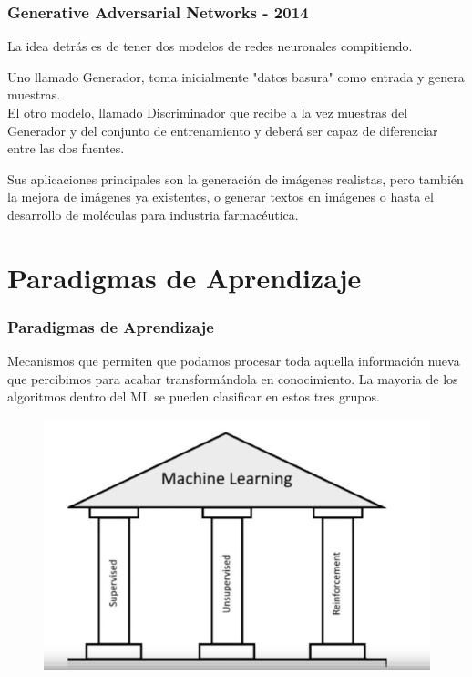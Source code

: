 \documentclass[
	11pt, %
]{beamer}
\begin{document}
\begin{frame}
  \frametitle{Generative Adversarial Networks - 2014}

  La idea detrás es de tener dos modelos de redes neuronales compitiendo.
  
  \bigskip %

  Uno llamado Generador, toma inicialmente "datos basura" como entrada y genera muestras.\\
  El otro modelo, llamado Discriminador que recibe a la vez muestras del Generador y del conjunto de entrenamiento y deberá ser capaz de diferenciar entre las dos fuentes.

  \bigskip %

  Sus aplicaciones principales son la generación de imágenes realistas, pero también la mejora de imágenes ya existentes, o generar textos en imágenes o hasta el desarrollo de moléculas para industria farmacéutica.
  
\end{frame}


\section{Paradigmas de Aprendizaje}
\begin{frame}
  \frametitle{Paradigmas de Aprendizaje}
  Mecanismos que permiten que podamos procesar toda aquella información nueva que percibimos para acabar transformándola en conocimiento. La mayoria de los algoritmos dentro del ML se pueden clasificar en estos tres grupos.

  \begin{figure}
    \includegraphics[width=0.6\linewidth]{machine.png}
  \end{figure}
  
\end{frame}
\end{document}
